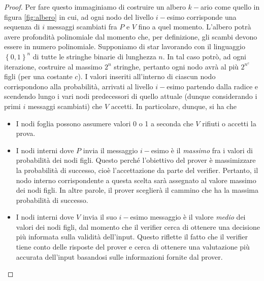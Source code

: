 \documentclass{article}
\theoremstyle{definition}
\begin{document}
\begin{proof}
    Per fare questo immaginiamo di costruire un albero $k-$ario come quello in figura \ref{fig:albero} in cui, ad ogni nodo del livello $i-$esimo corrisponde una sequenza di $i$ messaggi scambiati fra $P$ e $V$ fino a quel momento.
    L'albero potrà avere profondità polinomiale dal momento che, per definizione, gli scambi devono essere in numero polinomiale. Supponiamo di star lavorando con il linguaggio $\left\{0, 1\right\}^n$ di tutte le stringhe binarie di lunghezza $n$. In tal caso potrò, ad ogni iterazione, costruire al massimo $2^n$ stringhe, pertanto ogni nodo avrà al più $2^{n^c}$ figli (per una costante $c$). I valori inseriti all'interno di ciascun nodo corrispondono alla probabilità, arrivati al livello $i-$esimo partendo dalla radice e scendendo lungo i vari nodi predecessori di quello attuale (dunque considerando i primi $i$ messaggi scambiati) che $V$ accetti. In particolare, dunque, si ha che
    \begin{itemize}
        \item I nodi foglia possono assumere valori 0 o 1 a seconda che $V$ rifiuti o accetti la prova.
        \item I nodi interni dove $P$ invia il messaggio $i-$esimo è il \emph{massimo} fra i valori di probabilità dei nodi figli. Questo perché l'obiettivo del prover è massimizzare la probabilità di successo, cioè l'accettazione da parte del verifier. Pertanto, il nodo interno corrispondente a questa scelta sarà assegnato al valore massimo dei nodi figli. In altre parole, il prover sceglierà il cammino che ha la massima probabilità di successo.
        \item I nodi interni dove $V$ invia il suo $i-$esimo messaggio è il valore \emph{medio} dei valori dei nodi figli, dal momento che il verifier cerca di ottenere una decisione più informata sulla validità dell'input. Questo riflette il fatto che il verifier tiene conto delle risposte del prover e cerca di ottenere una valutazione più accurata dell'input basandosi sulle informazioni fornite dal prover.
    \end{itemize}

    \begin{figure}[H]
        \centering
\end{figure}
\end{proof}
\end{document}
